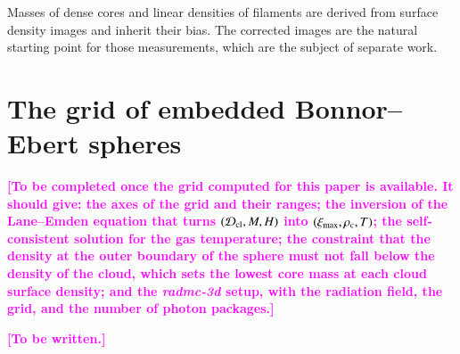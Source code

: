 \documentclass{aa}
\newcommand{\draftnote}[1]{\textcolor{magenta}{\textbf{[#1]}}}
\begin{document}
Masses of dense cores and linear densities of filaments are derived from
surface density images and inherit their bias. The corrected images are the
natural starting point for those measurements, which are the subject of
separate work.

\appendix

\section{The grid of embedded Bonnor--Ebert spheres}
\label{app:models}

\draftnote{To be completed once the grid computed for this paper is
available. It should give: the axes of the grid and their ranges; the
inversion of the Lane--Emden equation that turns
$(\mathcal{D}_{\rm cl}, M, H)$ into $(\xi_{\rm max}, \rho_{\rm c}, T)$; the
self-consistent solution for the gas temperature; the constraint that the
density at the outer boundary of the sphere must not fall below the density of
the cloud, which sets the lowest core mass at each cloud surface density; and
the \emph{radmc-3d} setup, with the radiation field, the grid, and the number
of photon packages.}

\begin{acknowledgements}
\draftnote{To be written.}
\end{acknowledgements}



\end{document}
